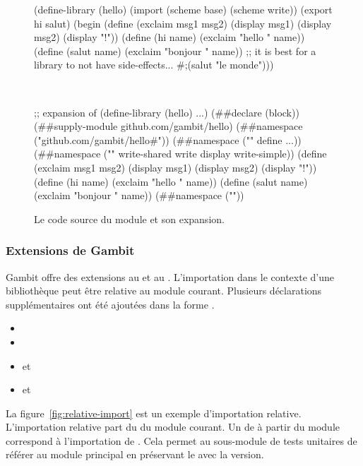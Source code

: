 \begin{figure}[ht]
  \centering
  \fontsize{12}{10}
\begin{mplisting}{0.9}
(define-library (hello)
  (import (scheme base) (scheme write))
  (export hi salut)
  (begin
    (define (exclaim msg1 msg2)
      (display msg1)
      (display msg2)
      (display "!\n"))
    (define (hi name) (exclaim "hello " name))
    (define (salut name) (exclaim "bonjour " name))
    ;; it is best for a library to not have side-effects...
    #;(salut "le monde")))
\end{mplisting}\\[4ex]
\begin{mplisting}{0.9}
;; expansion of (define-library (hello) ...)
(##declare (block))
(##supply-module github.com/gambit/hello)
(##namespace ("github.com/gambit/hello#"))
(##namespace ("" define ...))
(##namespace ("" write-shared write display write-simple))
(define (exclaim msg1 msg2)
    (display msg1) (display msg2) (display "!\n"))
(define (hi name) (exclaim "hello " name))
(define (salut name) (exclaim "bonjour " name))
(##namespace (""))
\end{mplisting}
  \caption{Le code source du module
     et son expansion.}
  \label{fig:define-library->expand}
\end{figure}

\subsubsection{Extensions de Gambit}

Gambit offre des extensions au  et au .
L'importation dans le contexte d'une bibliothèque peut être relative au module
courant. Plusieurs déclarations supplémentaires ont été ajoutées dans la forme
.

\begin{itemize}
  \item {}
  \item {}
  \item {} et 
  \item {} et 
\end{itemize}

La figure~\ref{fig:relative-import} est un exemple d'importation relative.
L'importation relative part du  du module courant.  Un
 de  à partir du module 
correspond à l'importation de . Cela permet au sous-module de
tests unitaires de référer au module principal en préservant le
 avec la version. \\[1ex]

